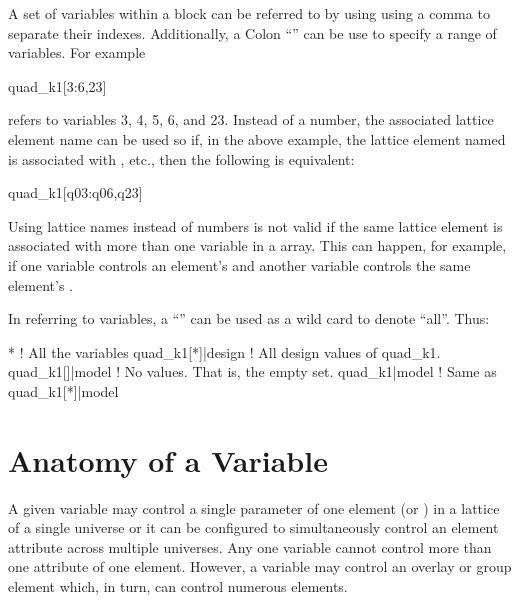 A set of variables within a  block can be referred to by using using a comma \vn{,} to
separate their indexes. Additionally, a Colon ``\vn{:}'' can be use to specify a range of
variables. For example
\begin{example}
  quad_k1[3:6,23]
\end{example}
refers to variables 3, 4, 5, 6, and 23. Instead of a number, the associated lattice element name can
be used so if, in the above example, the lattice element named  is associated with
, etc., then the following is equivalent:
\begin{example}
  quad_k1[q03:q06,q23]
\end{example}
Using lattice names instead of numbers is not valid if the same lattice element is associated with
more than one variable in a  array. This can happen, for example, if one variable
controls an element's  and another variable controls the same element's .

In referring to variables, a ``\vn{*}'' can be used as a wild card to 
denote ``all''. Thus:
\begin{example}
  *                 ! All the variables
  quad_k1[*]|design ! All design values of quad_k1.
  quad_k1[]|model   ! No values. That is, the empty set.
  quad_k1|model     ! Same as quad_k1[*]|model
\end{example}

\section{Anatomy of a Variable}
\label{s:var.anatomy}

A given variable may control a single parameter of one element (or ) in a
 lattice of a single universe or it can be configured to simultaneously control an element
attribute across multiple universes. Any one variable cannot control more than one attribute of one
element. However, a variable may control an overlay or group element which, in turn, can control
numerous elements.

